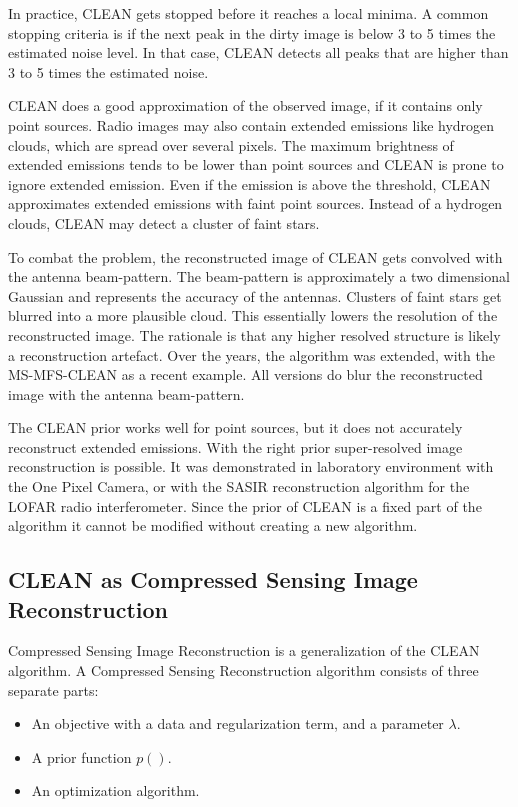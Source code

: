 In practice, CLEAN gets stopped before it reaches a local minima. A common stopping criteria is if the next peak in the dirty image is below 3 to 5 times the estimated noise level. In that case, CLEAN detects all peaks that are higher than 3 to 5 times the estimated noise. 

CLEAN does a good approximation of the observed image, if it contains only point sources. Radio images may also contain extended emissions like hydrogen clouds, which are spread over several pixels. The maximum brightness of extended emissions tends to be lower than point sources and CLEAN is prone to ignore extended emission. Even if the emission is above the threshold, CLEAN approximates extended emissions with faint point sources. Instead of a hydrogen clouds, CLEAN may detect a cluster of faint stars.

To combat the problem, the reconstructed image of CLEAN gets convolved with the antenna beam-pattern. The beam-pattern is approximately a two dimensional Gaussian and represents the accuracy of the antennas. Clusters of faint stars get blurred into a more plausible cloud. This essentially lowers the resolution of the reconstructed image. The rationale is that any higher resolved structure is likely a reconstruction artefact. Over the years, the algorithm was extended, with the MS-MFS-CLEAN\cite{rau2011multi} as a recent example. All versions do blur the reconstructed image with the antenna beam-pattern.

The CLEAN prior works well for point sources, but it does not accurately reconstruct extended emissions. With the right prior super-resolved image reconstruction is possible. It was demonstrated in laboratory environment with the One Pixel Camera\cite{singlePixel}, or with the SASIR\cite{girard2015sparse} reconstruction algorithm for the LOFAR radio interferometer. Since the prior of CLEAN is a fixed part of the algorithm it cannot be modified without creating a new algorithm.


\subsection{CLEAN as Compressed Sensing Image Reconstruction}
Compressed Sensing Image Reconstruction is a generalization of the CLEAN algorithm. A Compressed Sensing Reconstruction algorithm consists of three separate parts:
\begin{itemize}
	\item An objective with a data and regularization term, and a parameter $\lambda$.
	\item A prior function $p()$.
	\item An optimization algorithm.
\end{itemize}

